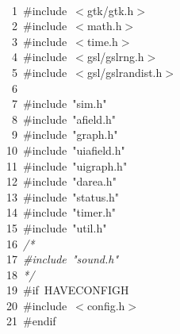 \documentclass[10pt,a4paper]{article}
\newcommand{\hlstd}[1]{\textcolor[rgb]{0,0,0}{#1}}
\newcommand{\hldstr}[1]{\textcolor[rgb]{0.51,0.51,0}{#1}}
\newcommand{\hlcom}[1]{\textcolor[rgb]{0.51,0.51,0.51}{\it{#1}}}
\newcommand{\hldir}[1]{\textcolor[rgb]{0,0.51,0}{#1}}
\newcommand{\hlline}[1]{\textcolor[rgb]{0.33,0.33,0.33}{#1}}
\begin{document}
\pagecolor{bgcolor}
\noindent
\ttfamily
\hlstd{\mbox{}\\
}\hlline{\ \ \ 1\ }\hlstd{}\hldir{\#include\ $<$gtk/gtk.h$>$\mbox{}\\
}\hlline{\ \ \ 2\ }\hldir{}\hlstd{}\hldir{\#include\ $<$math.h$>$\mbox{}\\
}\hlline{\ \ \ 3\ }\hldir{}\hlstd{}\hldir{\#include\ $<$time.h$>$\mbox{}\\
}\hlline{\ \ \ 4\ }\hldir{}\hlstd{}\hldir{\#include\ $<$gsl/gsl\textunderscore rng.h$>$\mbox{}\\
}\hlline{\ \ \ 5\ }\hldir{}\hlstd{}\hldir{\#include\ $<$gsl/gsl\textunderscore randist.h$>$\mbox{}\\
}\hlline{\ \ \ 6\ }\hldir{}\hlstd{\mbox{}\\
}\hlline{\ \ \ 7\ }\hlstd{}\hldir{\#include\ }\hldstr{"sim.h"}\hldir{\mbox{}\\
}\hlline{\ \ \ 8\ }\hldir{}\hlstd{}\hldir{\#include\ }\hldstr{"afield.h"}\hldir{\mbox{}\\
}\hlline{\ \ \ 9\ }\hldir{}\hlstd{}\hldir{\#include\ }\hldstr{"graph.h"}\hldir{\mbox{}\\
}\hlline{\ \ 10\ }\hldir{}\hlstd{}\hldir{\#include\ }\hldstr{"ui\textunderscore afield.h"}\hldir{\mbox{}\\
}\hlline{\ \ 11\ }\hldir{}\hlstd{}\hldir{\#include\ }\hldstr{"ui\textunderscore graph.h"}\hldir{\mbox{}\\
}\hlline{\ \ 12\ }\hldir{}\hlstd{}\hldir{\#include\ }\hldstr{"darea.h"}\hldir{\mbox{}\\
}\hlline{\ \ 13\ }\hldir{}\hlstd{}\hldir{\#include\ }\hldstr{"status.h"}\hldir{\mbox{}\\
}\hlline{\ \ 14\ }\hldir{}\hlstd{}\hldir{\#include\ }\hldstr{"timer.h"}\hldir{\mbox{}\\
}\hlline{\ \ 15\ }\hldir{}\hlstd{}\hldir{\#include\ }\hldstr{"util.h"}\hldir{\mbox{}\\
}\hlline{\ \ 16\ }\hldir{}\hlstd{}\hlcom{/*\mbox{}\\
}\hlline{\ \ 17\ }\hlcom{\#include\ "sound.h"\mbox{}\\
}\hlline{\ \ 18\ }\hlcom{*/}\hlstd{\mbox{}\\
}\hlline{\ \ 19\ }\hlstd{}\hldir{\#if\ HAVE\textunderscore CONFIG\textunderscore H\mbox{}\\
}\hlline{\ \ 20\ }\hldir{}\hlstd{}\hldir{\#include\ $<$config.h$>$\mbox{}\\
}\hlline{\ \ 21\ }\hldir{}\hlstd{}\hldir{\#endif\mbox{}\\
}
\end{document}
